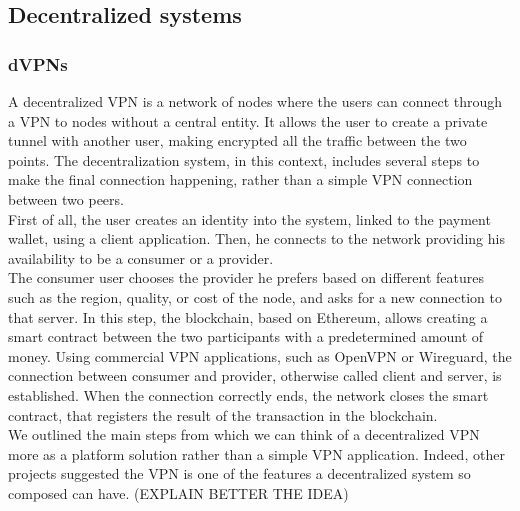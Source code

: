 \documentclass[]{article}
\begin{document}
	\subsection{Decentralized systems}

	\subsubsection{dVPNs}

	A decentralized VPN is a network of nodes where the users can connect through a VPN to nodes without a central entity. It allows the user to create a private tunnel with another user, making encrypted all the traffic between the two points. 
	The decentralization system, in this context, includes several steps to make the final connection happening, rather than a simple VPN connection between two peers.\\
	First of all, the user creates an identity into the system, linked to the payment wallet, using a client application. Then, he connects to the network providing his availability to be a consumer or a provider.\\
	The consumer user chooses the provider he prefers based on different features such as the region, quality, or cost of the node, and asks for a new connection to that server. In this step, the blockchain, based on Ethereum, allows creating a smart contract between the two participants with a predetermined amount of money. Using commercial VPN applications, such as OpenVPN or Wireguard, the connection between consumer and provider, otherwise called client and server, is established. When the connection correctly ends, the network closes the smart contract, that registers the result of the transaction in the blockchain.\\
	We outlined the main steps from which we can think of a decentralized VPN more as a platform solution rather than a simple VPN application. Indeed, other projects suggested the VPN is one of the features a decentralized system so composed can have. (EXPLAIN BETTER THE IDEA)  
		          
\end{document}
